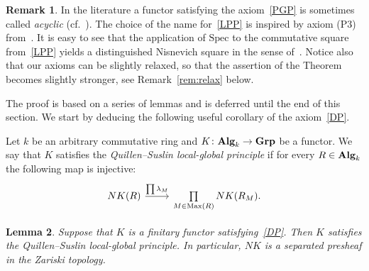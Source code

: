 \documentclass[oneside, 11pt]{amsart} \pdfoutput=1
\newcommand{\Max}{\mathrm{Max}}
\numberwithin{equation}{section}
\newtheorem{lemma}{Lemma} \numberwithin{lemma}{section}
\theoremstyle{definition}
\newtheorem{rem}[lemma]{Remark}
\newcommand{\catname}[1]{{\normalfont\textbf{#1}}} %
\begin{document}
\begin{rem}
 In the literature a functor satisfying the axiom~\ref{PGP} is sometimes called {\it acyclic} (cf.~\cite[Def.~III.4.1.1]{Kbook}).
The choice of the name for~\eqref{LPP} is inspired by axiom (P3) from~\cite[Proposition~3.3.4]{AHW18}. It is easy to see that the application of $\mathrm{Spec}$ to the commutative square from~\ref{LPP} yields a distinguished Nisnevich square in the sense of~\cite[Definition~3.1.3]{MV99}. Notice also that our axioms can be slightly relaxed, so that the assertion of the Theorem becomes slightly stronger, see Remark~\ref{rem:relax} below.
\end{rem}

The proof is based on a series of lemmas and is deferred until the end of this section. We start by deducing the following useful corollary of the axiom~\ref{DP}. 

Let $k$ be an arbitrary commutative ring and $K\colon \catname{Alg}_k \to \catname{Grp}$ be a functor.
We say that $K$ satisfies the {\it Quillen--Suslin local-global principle} if for every $R\in \catname{Alg}_k$ the following map is injective:
\begin{equation} \label{QS-def} \begin{tikzcd} NK(R) \ar{r}{\prod \lambda_M} & \prod\limits_{M \in \Max(R)} NK(R_M). \end{tikzcd} \end{equation}
\begin{lemma}\label{LGP}
Suppose that $K$ is a finitary functor satisfying~\ref{DP}. Then $K$ satisfies the Quillen--Suslin local-global principle. In particular, $NK$ is a separated presheaf in the Zariski topology.
\end{lemma}
\end{document}
